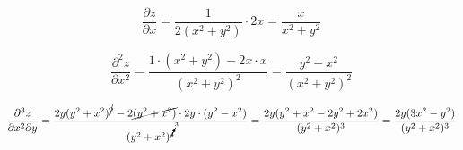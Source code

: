 \documentclass[../rgr1.tex]{subfiles}
\begin{document}
\Solution

\begin{equation}
	\frac{\partial z}{\partial x} = \frac{1}{2(x^2+y^2)} \cdot  2x
	= \frac{x}{x^2+y^2}
\end{equation}

\begin{equation}
	\frac{\partial^2 z}{\partial x^2}
	= \frac{1\cdot (x^2+y^2)-2x\cdot x}{(x^2+y^2)^2}
	= \frac{y^2-x^2}{(x^2+y^2)^2}
\end{equation}

\begin{dmath}
	\frac{\partial^3 z}{\partial x^2 \partial y}
	= \frac{2y(y^2+x^2)^{\cancel 2}-2\cancel{(y^2+x^2)}\cdot 2y\cdot (y^2-x^2)}{(y^2+x^2)^{\cancelto{3}{4}}}
	= \frac{2y(y^2+x^2-2y^2+2x^2)}{(y^2+x^2)^3}
	= \frac{2y(3x^2-y^2)}{(y^2+x^2)^3}
\end{dmath}

\end{document}
